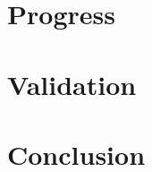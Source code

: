 \documentclass{sig-alternate-05-2015}
\begin{document}
\section{Progress}
\label{sec:progress}
% 

\section{Validation}
\label{sec:validation}
% 

\section{Conclusion}
\label{sec:conclusion}
% 






\end{document}
